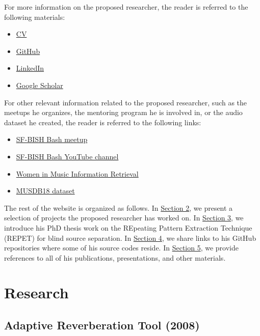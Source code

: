 \documentclass{article}
\begin{document}
For more information on the proposed researcher, the reader is referred to the following materials:
\begin{itemize}[noitemsep,topsep=0pt]
\item \href{http://zafarrafii.com/Zafar Rafii - CV.pdf}{CV}
\item \href{https://github.com/zafarrafii}{GitHub}
\item \href{https://www.linkedin.com/in/zafarrafii/}{LinkedIn}
\item \href{https://scholar.google.com/citations?user=8wbS2EsAAAAJ&hl=en}{Google Scholar}
\end{itemize}

For other relevant information related to the proposed researcher, such as the meetups he organizes, the mentoring program he is involved in, or the audio dataset he created, the reader is referred to the following links:
\begin{itemize}[noitemsep,topsep=0pt]
\item \href{https://www.meetup.com/bishbash/}{SF-BISH Bash meetup}
\item \href{https://www.youtube.com/channel/UCfVTmVY__IObKq06vZFryxA}{SF-BISH Bash YouTube channel}
\item \href{https://wimir.wordpress.com/}{Women in Music Information Retrieval}
\item \href{https://sigsep.github.io/datasets/musdb.html#musdb18-compressed-stems}{MUSDB18 dataset}
\end{itemize}

The rest of the website is organized as follows. In \hyperref[sec:research]{Section 2}, we present a selection of projects the proposed researcher has worked on. In \hyperref[sec:repet]{Section 3}, we introduce his PhD thesis work on the REpeating Pattern Extraction Technique (REPET) for blind source separation. In \hyperref[sec:codes]{Section 4}, we share links to his GitHub repositories where some of his source codes reside. In \hyperref[sec:refs]{Section 5}, we provide references to all of his publications, presentations, and other materials.


\section{Research}
\label{sec:research}

\subsection{Adaptive Reverberation Tool (2008)}
\label{ssec:reverb}
\end{document}
